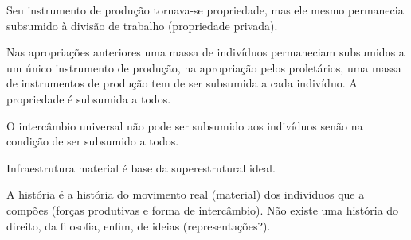 \documentclass[12pt]{article}
\begin{document}
Seu instrumento de produção tornava-se propriedade, mas ele mesmo permanecia subsumido à divisão de trabalho (propriedade privada).

Nas apropriações anteriores uma massa de indivíduos permaneciam subsumidos a um único instrumento de produção, na apropriação pelos proletários, uma massa de instrumentos de produção tem de ser subsumida a cada indivíduo. A propriedade é subsumida a todos.

O intercâmbio universal não pode ser subsumido aos indivíduos senão na condição de ser subsumido a todos.

Infraestrutura material é base da superestrutural ideal.

A história é a história do movimento real (material) dos indivíduos que a compões (forças produtivas e forma de intercâmbio). Não existe uma história do direito, da filosofia, enfim, de ideias (representações?).
\end{document}
